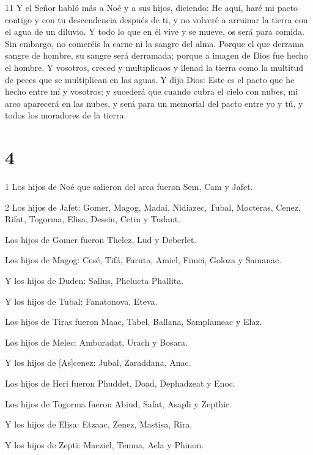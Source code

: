 \par 11 Y el Señor habló más a Noé y a sus hijos, diciendo: He aquí, haré mi pacto contigo y con tu descendencia después de ti, y no volveré a arruinar la tierra con el agua de un diluvio. Y todo lo que en él vive y se mueve, os será para comida. Sin embargo, no comeréis la carne ni la sangre del alma. Porque el que derrama sangre de hombre, su sangre será derramada; porque a imagen de Dios fue hecho el hombre. Y vosotros, creced y multiplicaos y llenad la tierra como la multitud de peces que se multiplican en las aguas. Y dijo Dios: Este es el pacto que he hecho entre mí y vosotros; y sucederá que cuando cubra el cielo con nubes, mi arco aparecerá en las nubes, y será para un memorial del pacto entre yo y tú, y todos los moradores de la tierra.

\chapter{4}

\par 1 Los hijos de Noé que salieron del arca fueron Sem, Cam y Jafet.

\par 2 Los hijos de Jafet: Gomer, Magog, Madai, Nidiazec, Tubal, Mocteras, Cenez, Rifat, Togorma, Elisa, Dessin, Cetin y Tudant.

Los hijos de Gomer fueron Thelez, Lud y Deberlet.

Los hijos de Magog: Cesé, Tifá, Faruta, Amiel, Fimei, Goloza y Samanac.

\par Y los hijos de Duden: Sallus, Phelucta Phallita.

\par Y los hijos de Tubal: Fanatonova, Eteva.

Los hijos de Tiras fueron Maac, Tabel, Ballana, Samplameac y Elaz.

Los hijos de Melec: Amboradat, Urach y Bosara.

\par Y los hijos de [As]cenez: Jubal, Zaraddana, Anac.

Los hijos de Heri fueron Phuddet, Doad, Dephadzeat y Enoc.

Los hijos de Togorma fueron Abiud, Safat, Asapli y Zepthir.

\par Y los hijos de Elisa: Etzaac, Zenez, Mastisa, Rira.

Y los hijos de Zepti: Macziel, Temna, Aela y Phinon.

